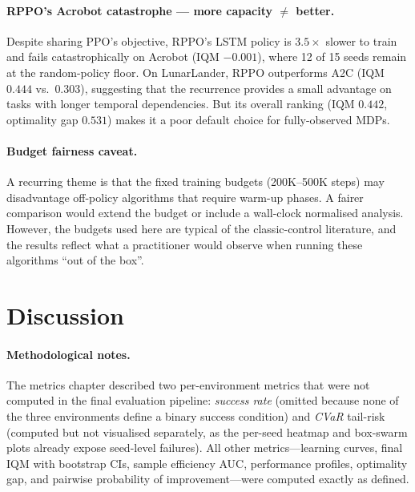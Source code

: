 \paragraph{RPPO's Acrobot catastrophe --- more capacity $\neq$ better.}
Despite sharing PPO's objective, RPPO's LSTM policy is $3.5\times$
slower to train and fails catastrophically on Acrobot (IQM $-0.001$),
where 12 of 15 seeds remain at the random-policy floor. On LunarLander,
RPPO outperforms A2C (IQM $0.444$ vs.\ $0.303$), suggesting that the
recurrence provides a small advantage on tasks with longer temporal
dependencies. But its overall ranking (IQM $0.442$, optimality gap
$0.531$) makes it a poor default choice for fully-observed MDPs.

\paragraph{Budget fairness caveat.}
A recurring theme is that the fixed training budgets (200K--500K steps)
may disadvantage off-policy algorithms that require warm-up phases.
A fairer comparison would extend the budget or include a wall-clock
normalised analysis. However, the budgets used here are typical of
the classic-control literature, and the results reflect what a
practitioner would observe when running these algorithms
``out of the box''.

\section{Discussion}
\label{sec:discussion}

\paragraph{Methodological notes.}
The metrics chapter described two per-environment metrics that were not
computed in the final evaluation pipeline: \emph{success rate} (omitted
because none of the three environments define a binary success condition)
and \emph{CVaR} tail-risk (computed but not visualised separately, as the
per-seed heatmap and box-swarm plots already expose seed-level failures).
All other metrics---learning curves, final IQM with bootstrap CIs,
sample efficiency AUC, performance profiles, optimality gap, and pairwise
probability of improvement---were computed exactly as defined.


